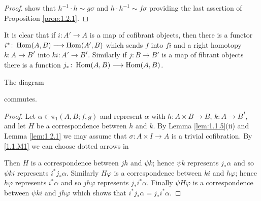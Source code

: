 \documentclass[../main]{subfiles}
\begin{document}
\begin{proof}
{    }
    show that $h^{-1} \cdot h \sim g \sigma$ and $h \cdot h^{-1} \sim f \sigma$ providing the last assertion of Proposition \ref{prop:1.2.1}.
\end{proof}
It is clear that if $i \colon A' \longrightarrow A$ is a map of cofibrant objects, then there is a functor $i^* \colon \operatorname{Hom} (A,B) \longrightarrow \operatorname{Hom} (A', B)$ which sends $f$ into $fi$ and a right homotopy $k \colon A \longrightarrow B^I$ into $ki \colon A' \longrightarrow B^I$. Similarly if $j \colon B \longrightarrow B'$ is a map of fibrant objects there is a function $j_* \colon \operatorname{Hom} (A,B) \longrightarrow \operatorname{Hom}(A,B)$.
\begin{lemma}\label{lem:1.2.3}
    The diagram
    \begin{center}
    \end{center}
    commutes.
\end{lemma}
\begin{proof}
    Let $\alpha \in \pi_1(A,B;f,g)$ and represent $\alpha$ with $h \colon A \times B \longrightarrow B$, $k \colon A \longrightarrow B^I$, and let $H$ be a correspondence between $h$ and $k$. By Lemma \ref{lem:1.1.5}(ii) and Lemma \ref{lem:1.2.1} we may assume that $\sigma \colon A \times I \longrightarrow A$ is a trivial cofibration. By \ref{1.1.M1} we can choose dotted arrows in
    \begin{center}
    \end{center}
    Then $H$ is a correspondence between $jh$ and $\psi k$; hence $\psi k$ represents $j_* \alpha$ and so $\psi k i$ represents $i^* j_* \alpha$. Similarly $H\varphi$ is a correspondence between $ k i$ and $h\varphi$; hence $h\varphi$ represents $i^* \alpha$ and so $jh\varphi$ represents $j_*i^*\alpha$. Finally $\psi H\varphi$ is a correspondence between $\psi ki$ and $jh\varphi$ which shows that $i^* j_* \alpha = j_* i^* \alpha$.
\end{proof}
\end{document}
